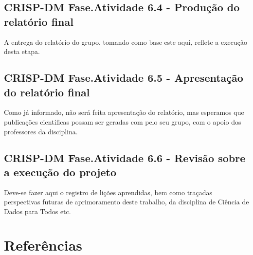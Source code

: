 \documentclass[]{article}
\begin{document}
\subsection{CRISP-DM Fase.Atividade 6.4 - Produção do relatório
final}\label{crisp-dm-fase.atividade-6.4---producao-do-relatorio-final}

A entrega do relatório do grupo, tomando como base este aqui, reflete a
execução desta etapa.

\subsection{CRISP-DM Fase.Atividade 6.5 - Apresentação do relatório
final}\label{crisp-dm-fase.atividade-6.5---apresentacao-do-relatorio-final}

Como já informado, não será feita apresentação do relatório, mas
esperamos que publicações científicas possam ser geradas com pelo seu
grupo, com o apoio dos professores da disciplina.

\subsection{CRISP-DM Fase.Atividade 6.6 - Revisão sobre a execução do
projeto}\label{crisp-dm-fase.atividade-6.6---revisao-sobre-a-execucao-do-projeto}

Deve-se fazer aqui o registro de lições aprendidas, bem como traçadas
perspectivas futuras de aprimoramento deste trabalho, da disciplina de
Ciência de Dados para Todos etc.

\section{Referências}\label{referencias}
\end{document}
